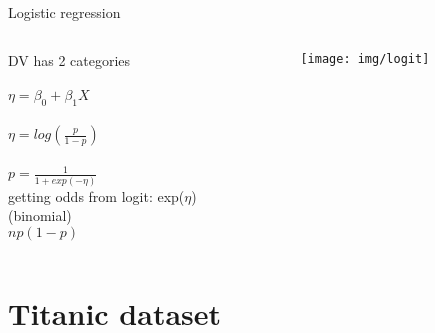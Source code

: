 \documentclass[presentation]{beamer}
\begin{document}
\begin{frame}[label={sec:org0275250}]{Logistic regression}
\begin{columns}[T]
\begin{column}{.5\textwidth}
DV has 2 categories\\[6pt]
\\
$\eta = \beta_0 + \beta_1 X$\\
\vspace{6pt}
\\
$\eta = log\left(\frac{p}{1-p}\right)$\\
\vspace{6pt}
\\
$p = \frac{1}{1+exp(-\eta)}$\\
getting odds from logit: exp($\eta$)\\
\vspace{6pt}
 (binomial)\\
$np(1-p)$\\
\end{column}
\begin{column}{.5\textwidth}
\texttt{[image: img/logit]}
\end{column}
\end{columns}
\end{frame}

\section*{Titanic dataset}
\label{sec:org957467c}
\end{document}
